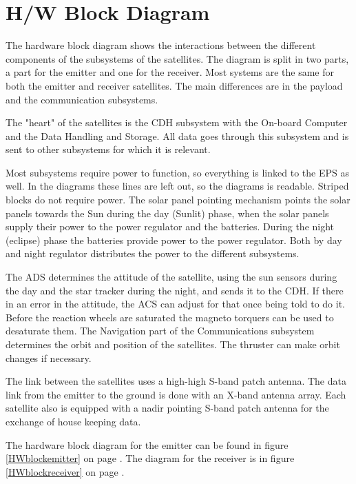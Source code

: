 \section{H/W Block Diagram}
\label{section_HWBD}
The hardware block diagram shows the interactions between the different components of the subsystems of the satellites. The diagram is split in two parts, a part for the emitter and one for the receiver. Most systems are the same for both the emitter and receiver satellites. The main differences are in the payload and the communication subsystems.

The "heart" of the satellites is the \ac{CDH} subsystem with the On-board Computer and the Data Handling and Storage. All data goes through this subsystem and is sent to other subsystems for which it is relevant. 

Most subsystems require power to function, so everything is linked to the \ac{EPS} as well. In the diagrams these lines are left out, so the diagrams is readable. Striped blocks do not require power. The solar panel pointing mechanism points the solar panels towards the Sun during the day (Sunlit) phase, when the solar panels supply their power to the power regulator and the batteries. During the night (eclipse) phase the batteries provide power to the power regulator. Both by day and night regulator distributes the power to the different subsystems.

The \ac{ADS} determines the attitude of the satellite, using the sun sensors during the day and the star tracker during the night, and sends it to the \ac{CDH}. If there in an error in the attitude, the \ac{ACS} can adjust for that once being told to do it. Before the reaction wheels are saturated the magneto torquers can be used to desaturate them. The Navigation part of the Communications subsystem determines the orbit and position of the satellites. The thruster can make orbit changes if necessary.

The link between the satellites uses a high-high S-band patch antenna. The data link from the emitter to the ground is done with an X-band antenna array. Each satellite also is equipped with a nadir pointing S-band patch antenna for the exchange of house keeping data.

The hardware block diagram for the emitter can be found in figure \ref{HWblockemitter} on page \pageref{HWblockemitter}. The diagram for the receiver is in figure \ref{HWblockreceiver} on page \pageref{HWblockreceiver}.

